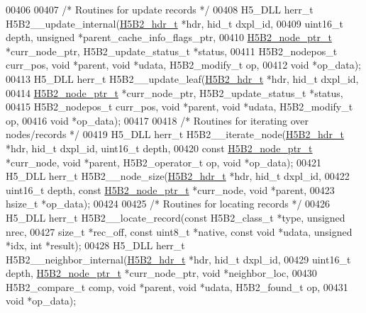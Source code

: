 \begin{DoxyCode}
{{00406 
00407 \textcolor{comment}{/* Routines for update records */}
00408 H5\_DLL herr\_t H5B2\_\_update\_internal(\hyperlink{struct_h5_b2__hdr__t}{H5B2\_hdr\_t} *hdr, hid\_t dxpl\_id,
00409     uint16\_t depth, \textcolor{keywordtype}{unsigned} *parent\_cache\_info\_flags\_ptr,
00410     \hyperlink{struct_h5_b2__node__ptr__t}{H5B2\_node\_ptr\_t} *curr\_node\_ptr, H5B2\_update\_status\_t *status,
00411     H5B2\_nodepos\_t curr\_pos, \textcolor{keywordtype}{void} *parent, \textcolor{keywordtype}{void} *udata, H5B2\_modify\_t op,
00412     \textcolor{keywordtype}{void} *op\_data);
00413 H5\_DLL herr\_t H5B2\_\_update\_leaf(\hyperlink{struct_h5_b2__hdr__t}{H5B2\_hdr\_t} *hdr, hid\_t dxpl\_id,
00414     \hyperlink{struct_h5_b2__node__ptr__t}{H5B2\_node\_ptr\_t} *curr\_node\_ptr, H5B2\_update\_status\_t *status,
00415     H5B2\_nodepos\_t curr\_pos, \textcolor{keywordtype}{void} *parent, \textcolor{keywordtype}{void} *udata, H5B2\_modify\_t op,
00416     \textcolor{keywordtype}{void} *op\_data);
00417 
00418 \textcolor{comment}{/* Routines for iterating over nodes/records */}
00419 H5\_DLL herr\_t H5B2\_\_iterate\_node(\hyperlink{struct_h5_b2__hdr__t}{H5B2\_hdr\_t} *hdr, hid\_t dxpl\_id, uint16\_t depth,
00420     \textcolor{keyword}{const} \hyperlink{struct_h5_b2__node__ptr__t}{H5B2\_node\_ptr\_t} *curr\_node, \textcolor{keywordtype}{void} *parent, H5B2\_operator\_t op, \textcolor{keywordtype}{void} *op\_data);
00421 H5\_DLL herr\_t H5B2\_\_node\_size(\hyperlink{struct_h5_b2__hdr__t}{H5B2\_hdr\_t} *hdr, hid\_t dxpl\_id,
00422     uint16\_t depth, \textcolor{keyword}{const} \hyperlink{struct_h5_b2__node__ptr__t}{H5B2\_node\_ptr\_t} *curr\_node, \textcolor{keywordtype}{void} *parent,
00423     hsize\_t *op\_data);
00424 
00425 \textcolor{comment}{/* Routines for locating records */}
00426 H5\_DLL herr\_t H5B2\_\_locate\_record(\textcolor{keyword}{const} H5B2\_class\_t *type, \textcolor{keywordtype}{unsigned} nrec,
00427     \textcolor{keywordtype}{size\_t} *rec\_off, \textcolor{keyword}{const} uint8\_t *native, \textcolor{keyword}{const} \textcolor{keywordtype}{void} *udata, \textcolor{keywordtype}{unsigned} *idx, \textcolor{keywordtype}{int} *result);
00428 H5\_DLL herr\_t H5B2\_\_neighbor\_internal(\hyperlink{struct_h5_b2__hdr__t}{H5B2\_hdr\_t} *hdr, hid\_t dxpl\_id,
00429     uint16\_t depth, \hyperlink{struct_h5_b2__node__ptr__t}{H5B2\_node\_ptr\_t} *curr\_node\_ptr, \textcolor{keywordtype}{void} *neighbor\_loc,
00430     H5B2\_compare\_t comp, \textcolor{keywordtype}{void} *parent, \textcolor{keywordtype}{void} *udata, H5B2\_found\_t op,
00431     \textcolor{keywordtype}{void} *op\_data);
}}
\end{DoxyCode}
